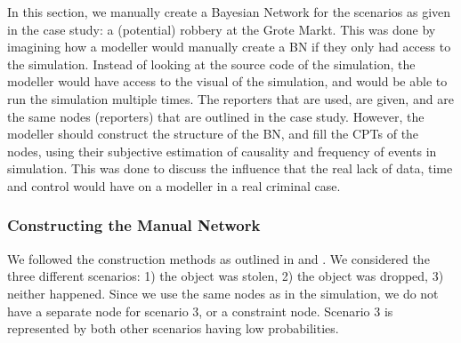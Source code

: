 \documentclass[12pt]{article}
\begin{document}
In this section, we manually create a Bayesian Network for the scenarios as given in the case study: a (potential) robbery at the Grote Markt. This was done by imagining how a modeller would manually create a BN if they only had access to the simulation. Instead of looking at the source code of the simulation, the modeller would have access to the visual of the simulation, and would be able to run the simulation multiple times. The reporters that are used, are given, and are the same nodes (reporters)  that are outlined in the case study. However, the modeller should construct the structure of the BN, and fill the CPTs of the nodes, using their subjective estimation of causality and frequency of events in simulation. This was done to discuss the influence that the real lack of data, time and control would have on a modeller in a real criminal case.  





\subsubsection{Constructing the Manual Network}

We followed the construction methods as outlined in \citep{Vlek2016} and \citep{vanLeeuwen2019}. We considered the three different scenarios: 1) the object was stolen, 2) the object was dropped, 3) neither happened. Since we use the same nodes as in the simulation, we do not have a separate node for scenario 3, or a constraint node. Scenario 3 is represented by both other scenarios having low probabilities.
 
\end{document}

